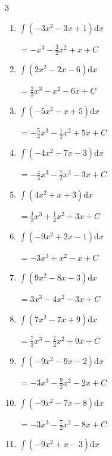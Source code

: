 \begin{multicols}{3}
\begin{enumerate}
  \item $\displaystyle \int \left( -3x^{2}-3x+1 \right) \mathrm{d}x$

        $\displaystyle =-x^{3}-\frac{3}{2}x^{2}+x+ C$

  \item $\displaystyle \int \left( 2x^{2}-2x-6 \right) \mathrm{d}x$

        $\displaystyle =\frac{2}{3}x^{3}-x^{2}-6x+ C$

  \item $\displaystyle \int \left( -5x^{2}-x+5 \right) \mathrm{d}x$

        $\displaystyle =-\frac{5}{3}x^{3}-\frac{1}{2}x^{2}+5x+ C$

  \item $\displaystyle \int \left( -4x^{2}-7x-3 \right) \mathrm{d}x$

        $\displaystyle =-\frac{4}{3}x^{3}-\frac{7}{2}x^{2}-3x+ C$

  \item $\displaystyle \int \left( 4x^{2}+x+3 \right) \mathrm{d}x$

        $\displaystyle =\frac{4}{3}x^{3}+\frac{1}{2}x^{2}+3x+ C$

  \item $\displaystyle \int \left( -9x^{2}+2x-1 \right) \mathrm{d}x$

        $\displaystyle =-3x^{3}+x^{2}-x+ C$

  \item $\displaystyle \int \left( 9x^{2}-8x-3 \right) \mathrm{d}x$

        $\displaystyle =3x^{3}-4x^{2}-3x+ C$

  \item $\displaystyle \int \left( 7x^{2}-7x+9 \right) \mathrm{d}x$

        $\displaystyle =\frac{7}{3}x^{3}-\frac{7}{2}x^{2}+9x+ C$

  \item $\displaystyle \int \left( -9x^{2}-9x-2 \right) \mathrm{d}x$

        $\displaystyle =-3x^{3}-\frac{9}{2}x^{2}-2x+ C$

\columnbreak %

  \item $\displaystyle \int \left( -9x^{2}-7x-8 \right) \mathrm{d}x$

        $\displaystyle =-3x^{3}-\frac{7}{2}x^{2}-8x+ C$

  \item $\displaystyle \int \left( -9x^{2}+x-3 \right) \mathrm{d}x$


\end{enumerate}
\end{multicols}
